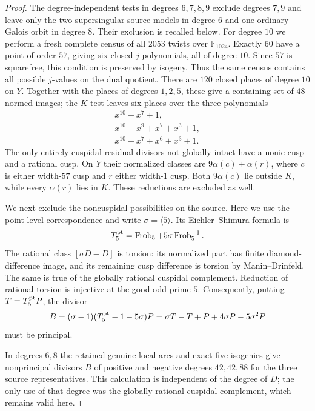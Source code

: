 \begin{proof}
The degree-independent tests in degrees $6,7,8,9$ exclude degrees
$7,9$ and leave only the two supersingular source models in degree
$6$ and one ordinary Galois orbit in degree $8$. Their exclusion
is recalled below. For degree $10$ we perform a fresh complete
census of all $2053$ twists over $\mathbb F_{1024}$. Exactly $60$
have a point of order $57$, giving six closed $j$-polynomials,
all of degree $10$. Since $57$ is squarefree, this condition is
preserved by isogeny. Thus the same census contains all possible
$j$-values on the dual quotient.
There are $120$ closed places of degree $10$ on $Y$. Together
with the places of degrees $1,2,5$, these give a containing set
of $48$ normed images; the $K$ test leaves six places over the
three polynomials
\[
 \begin{gathered}
 x^{10}+x^7+1,\\
 x^{10}+x^9+x^7+x^3+1,\\
 x^{10}+x^7+x^6+x^3+1.
 \end{gathered}
\]
The only entirely cuspidal residual divisors not globally intact
have a nonic cusp and a rational cusp. On $Y$ their normalized
classes are $9\alpha(c)+\alpha(r)$, where $c$ is either
width-$57$ cusp and $r$ either width-$1$ cusp. Both
$9\alpha(c)$ lie outside $K$, while every $\alpha(r)$ lies in
$K$. These reductions are excluded as well.

We next exclude the noncuspidal possibilities on the source.
Here we use the point-level correspondence and write
$\sigma=\langle5\rangle$. Its Eichler--Shimura formula is
\[
 T_5^{\rm pt}=\operatorname{Frob}_5+
                 5\sigma\operatorname{Frob}_5^{-1}.
\]
The rational class $[\sigma D-D]$ is torsion: its normalized
part has finite diamond-difference image, and its remaining
cusp difference is torsion by Manin--Drinfeld. The same is true
of the globally rational cuspidal complement. Reduction of
rational torsion is injective at the good odd prime $5$.
Consequently, putting $T=T_5^{\rm pt}P$, the divisor
\[
 B=(\sigma-1)(T_5^{\rm pt}-1-5\sigma)P
   =\sigma T-T+P+4\sigma P-5\sigma^2P
\]
must be principal.

In degrees $6,8$ the retained genuine local arcs and exact
five-isogenies give nonprincipal divisors $B$ of positive and
negative degrees $42,42,88$ for the three source representatives.
This calculation is independent of the degree of $D$; the only
use of that degree was the globally rational cuspidal complement,
which remains valid here.


\end{proof}
